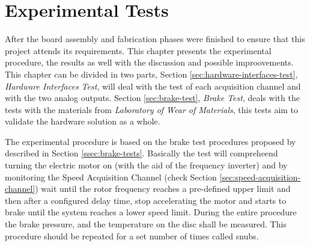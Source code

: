 \chapter{Experimental Tests}\label{ch:experimentalTests}
		After the board assembly and fabrication phases were finished to ensure that this project attends its requirements. This chapter presents the experimental procedure, the results as well with the discussion and possible improovements. This chapter can be divided in two parts, Section \ref{sec:hardware-interfaces-test}, \textit{Hardware Interfaces Test}, will deal with the test of each acquisition channel and with the two analog outputs. Section \ref{sec:brake-test}, \textit{Brake Test}, deals with the tests with the materials from \textit{Laboratory of Wear of Materials}, this tests aim to validate the hardware solution as a whole.
		\par
		The experimental procedure is based on the brake test procedures proposed by \cite{saej2522} described in Section \ref{ssec:brake-tests}. Basically the test will compreheend turning the electric motor on (with the aid of the frequency inverter) and by monitoring the Speed Acquisition Channel (check Section \ref{sec:speed-acquisition-channel}) wait until the rotor frequency reaches a pre-defined upper limit and then after a configured delay time, stop accelerating the motor and starts to brake until the system reaches a lower speed limit. During the entire procedure the brake pressure, and the temperature on the disc shall be measured. This procedure should be repeated for a set number of times called snubs. 

		
		